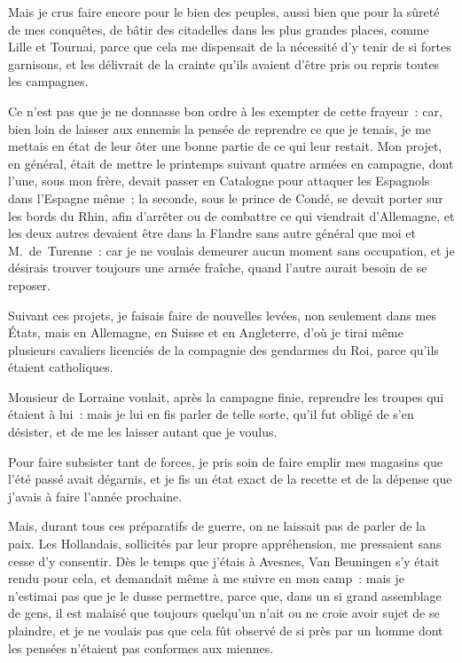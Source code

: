\documentclass[french,twoside]{book} %
\begin{document}
Mais je crus faire encore pour le bien des peuples, aussi bien que pour la sûreté de mes conquêtes, de bâtir des citadelles dans les plus grandes places, comme Lille et Tournai, parce que cela me dispensait de la nécessité d’y tenir de si fortes garnisons, et les délivrait de la crainte qu’ils avaient d’être pris ou repris toutes les campagnes.\par
Ce n’est pas que je ne donnasse bon ordre à les exempter de cette frayeur : car, bien loin de laisser aux ennemis la pensée de reprendre ce que je tenais, je me mettais en état de leur ôter une bonne partie de ce qui leur restait. Mon projet, en général, était de mettre le printemps suivant quatre armées en campagne, dont l’une, sous mon frère, devait passer en Catalogne pour attaquer les Espagnols dans l’Espagne même ; la seconde, sous le prince de Condé, se devait porter sur les bords du Rhin, afin d’arrêter ou de combattre ce qui viendrait d’Allemagne, et les deux autres devaient être dans la Flandre sans autre général que moi et M. de Turenne : car je ne voulais demeurer aucun moment sans occupation, et je désirais trouver toujours une armée fraîche, quand l’autre aurait besoin de se reposer.\par
Suivant ces projets, je faisais faire de nouvelles levées, non seulement dans mes États, mais en Allemagne, en Suisse et en Angleterre, d’où je tirai même plusieurs cavaliers licenciés de la compagnie des gendarmes du Roi, parce qu’ils étaient catholiques.\par
Monsieur de Lorraine voulait, après la campagne finie, reprendre les troupes qui étaient à lui : mais je lui en fis parler de telle sorte, qu’il fut obligé de s’en désister, et de me les laisser autant que je voulus.\par
Pour faire subsister tant de forces, je pris soin de faire emplir mes magasins que l’été passé avait dégarnis, et je fis un état exact de la recette et de la dépense que j’avais à faire l’année prochaine.\par
Mais, durant tous ces préparatifs de guerre, on ne laissait pas de parler de la paix. Les Hollandais, sollicités par leur propre appréhension, me pressaient sans cesse d’y consentir. Dès le temps que j’étais à Avesnes, Van Beuningen s’y était rendu pour cela, et demandait même à me suivre en mon camp : mais je n’estimai pas que je le dusse permettre, parce que, dans un si grand assemblage de gens, il est malaisé que toujours quelqu’un n’ait ou ne croie avoir sujet de se plaindre, et je ne voulais pas que cela fût observé de si près par un homme dont les pensées n’étaient pas conformes aux miennes.\par
\end{document}
